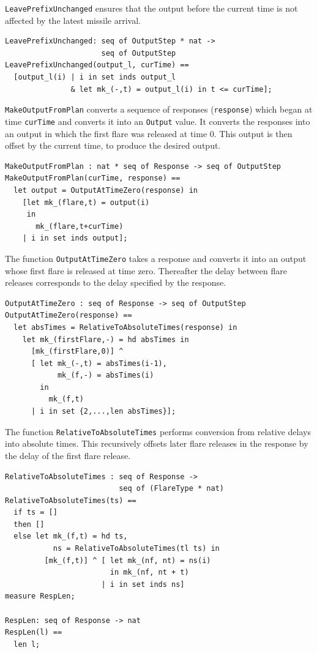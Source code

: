 \documentclass{overturerepchap}
\begin{document}
\texttt{LeavePrefixUnchanged} ensures that the output before the
current time is not affected by the latest missile arrival.

\begin{lstlisting}
LeavePrefixUnchanged: seq of OutputStep * nat -> 
                      seq of OutputStep
LeavePrefixUnchanged(output_l, curTime) ==
  [output_l(i) | i in set inds output_l
               & let mk_(-,t) = output_l(i) in t <= curTime];
\end{lstlisting}

\texttt{MakeOutputFromPlan} converts a sequence of responses
(\texttt{response}) which began at time \texttt{curTime} and converts it into
an \texttt{Output} value. It converts the responses into an output in
which the first flare was released at time 0. This output is then
offset by the current time, to produce the desired output.

\begin{lstlisting}
MakeOutputFromPlan : nat * seq of Response -> seq of OutputStep
MakeOutputFromPlan(curTime, response) ==
  let output = OutputAtTimeZero(response) in
    [let mk_(flare,t) = output(i)
     in
       mk_(flare,t+curTime)
    | i in set inds output];
\end{lstlisting}

The function \texttt{OutputAtTimeZero} takes a response and converts
it into an output whose first flare is released at time
zero. Thereafter the delay between flare releases corresponds to the
delay specified by the response.

\begin{lstlisting}
OutputAtTimeZero : seq of Response -> seq of OutputStep
OutputAtTimeZero(response) ==
  let absTimes = RelativeToAbsoluteTimes(response) in
    let mk_(firstFlare,-) = hd absTimes in
      [mk_(firstFlare,0)] ^
      [ let mk_(-,t) = absTimes(i-1),
            mk_(f,-) = absTimes(i) 
        in
          mk_(f,t) 
      | i in set {2,...,len absTimes}];
\end{lstlisting}

The function \texttt{RelativeToAbsoluteTimes} performs conversion from
relative delays into absolute times. This recursively offsets later
flare releases in the response by the delay of the first flare
release.

\begin{lstlisting}
RelativeToAbsoluteTimes : seq of Response -> 
                          seq of (FlareType * nat)
RelativeToAbsoluteTimes(ts) ==
  if ts = []
  then []
  else let mk_(f,t) = hd ts,
           ns = RelativeToAbsoluteTimes(tl ts) in
         [mk_(f,t)] ^ [ let mk_(nf, nt) = ns(i)
                        in mk_(nf, nt + t)
                      | i in set inds ns]
measure RespLen;

RespLen: seq of Response -> nat
RespLen(l) ==
  len l;
\end{lstlisting}
\end{document}
